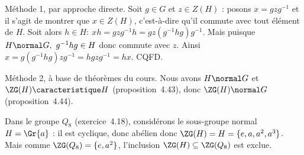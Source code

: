 
Méthode 1, par approche directe. Soit $g\in G$ et $z\in Z(H)$ : posons $x = gzg^{-1}$ et il s'agit de montrer que $x\in Z(H)$, c'est-à-dire qu'il commute avec tout élément de $H$.
Soit alors $h\in H :~ xh = gzg^{-1}h = gz(g^{-1}hg)g^{-1}$. Mais puisque $H \normal G,~ g^{-1}hg \in H$ donc commute avec $z$. Ainsi $x = g (g^{-1}hg)zg^{-1} = h gzg^{-1} = hx$. CQFD.


Méthode 2, à base de théorèmes du cours.
Nous avons $H\normal G$ et $\ZG(H)\caracteristique H$ (proposition~4.43), donc $\ZG(H)\normal G$ (proposition~4.44).

Dans le groupe $Q_8$ (exercice~4.18), considérons le sous-groupe normal $H = \Gr{a}$ : il est cyclique, donc abélien donc $\ZG(H) = H = \{e, a, a^2, a^3\}$. Mais comme $\ZG(Q_8) = \{e, a^2\}$, l'inclusion $\ZG(H) \subseteq \ZG(Q_8)$ est exclue.
